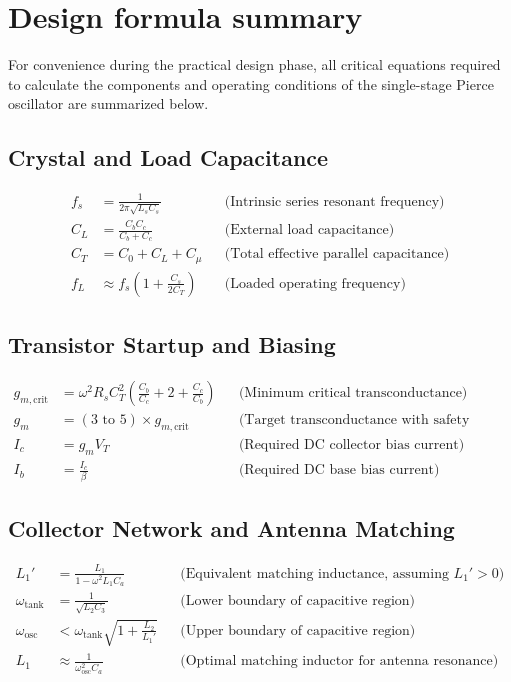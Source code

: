 \section{Design formula summary}

For convenience during the practical design phase, all critical equations required to calculate the components and operating conditions of the single-stage Pierce oscillator are summarized below.

\subsection*{Crystal and Load Capacitance}
\begin{align}
	f_s &= \frac{1}{2\pi \sqrt{L_s C_s}} && \text{(Intrinsic series resonant frequency)} \\
	C_L &= \frac{C_b C_c}{C_b + C_c} && \text{(External load capacitance)} \\
	C_T &= C_0 + C_L + C_\mu && \text{(Total effective parallel capacitance)} \\
	f_L &\approx f_s \left(1 + \frac{C_s}{2 C_T}\right) && \text{(Loaded operating frequency)}
\end{align}

\subsection*{Transistor Startup and Biasing}
\begin{align}
	g_{m,\text{crit}} &= \omega^2 R_s C_T^2 \left( \frac{C_b}{C_c} + 2 + \frac{C_c}{C_b} \right) && \text{(Minimum critical transconductance)} \\
	g_m &= (3 \text{ to } 5) \times g_{m,\text{crit}} && \text{(Target transconductance with safety margin)} \\
	I_c &= g_m V_T && \text{(Required DC collector bias current)} \\
	I_b &= \frac{I_c}{\beta} && \text{(Required DC base bias current)}
\end{align}

\subsection*{Collector Network and Antenna Matching}
\begin{align}
	L_1' &= \frac{L_1}{1 - \omega^2 L_1 C_a} && \text{(Equivalent matching inductance, assuming } L_1' > 0) \\
	\omega_{\text{tank}} &= \frac{1}{\sqrt{L_2 C_3}} && \text{(Lower boundary of capacitive region)} \\
	\omega_{\text{osc}} &< \omega_{\text{tank}} \sqrt{1 + \frac{L_2}{L_1'}} && \text{(Upper boundary of capacitive region)} \\
	L_1 &\approx \frac{1}{\omega_{\text{osc}}^2 C_a} && \text{(Optimal matching inductor for antenna resonance)}
\end{align}
